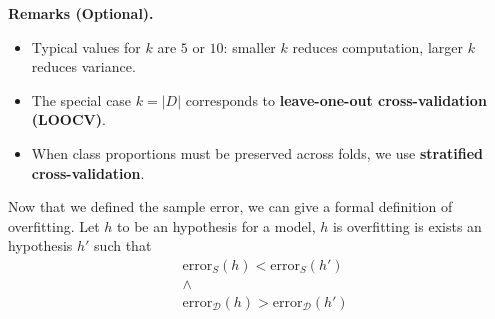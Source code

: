 \documentclass[10pt, letterpaper]{report}
\begin{document}
\bigskip
\textbf{Remarks (Optional).}
\begin{itemize}
	\item Typical values for $k$ are $5$ or $10$: smaller $k$ reduces computation, larger $k$ reduces variance.
	\item The special case $k = |D|$ corresponds to \textbf{leave-one-out cross-validation (LOOCV)}.
	\item When class proportions must be preserved across folds, we use \textbf{stratified cross-validation}.
\end{itemize}

\bigskip
Now that we defined the sample error, we can give a formal definition of overfitting. Let $h$  to be an hypothesis for a model, $h$ is overfitting is exists an hypothesis $h'$ such that\begin{align}
	 & \text{error}_{S}(h)<\text{error}_{S}(h')                   \\ &\land\\
	 & \text{error}_{\mathcal D}(h)>\text{error}_{\mathcal D}(h')
\end{align}
\end{document}
